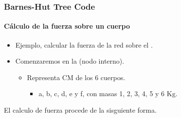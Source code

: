 \frame
{
\frametitle{Barnes-Hut Tree Code}
\framesubtitle{Cálculo de la fuerza sobre un cuerpo}

\begin{itemize}
	\item Ejemplo, calcular la fuerza de la red sobre el .
	\item Comenzaremos en la  (nodo interno).
	\begin{itemize}
		\item Representa CM de los 6 cuerpos.
		 \begin{itemize}
		 	\item a, b, c, d, e y f, con masas 1, 2, 3, 4, 5 y 6 Kg.
		 \end{itemize}
	\end{itemize}
\end{itemize}
El calculo de fuerza procede de la sisguiente forma.
}

